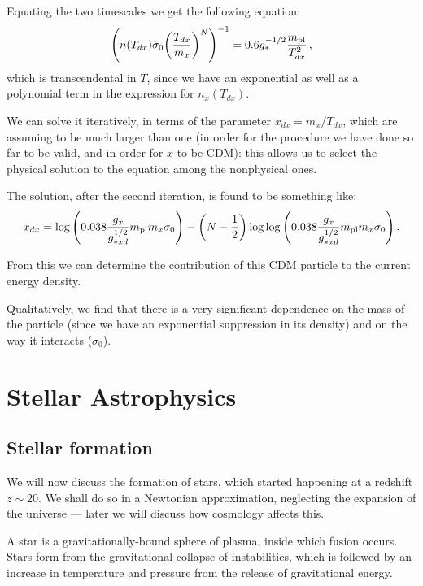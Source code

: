 \documentclass[main.tex]{subfiles}
\begin{document}
Equating the two timescales we get the following equation:
%
\begin{align}
\qty(n(T_{dx}) \sigma _0 \qty(\frac{T_{dx}}{m_x})^{N})^{-1} = \num{.6} g_{*}^{-1/2} \frac{m _{\text{pl}}}{T_{dx}^2}
\,,
\end{align}
%
which is transcendental in \(T\), since we have an exponential as well as a polynomial term in the expression for \(n_x(T_{dx})\).

We can solve it iteratively, in terms of the parameter \(x_{dx} = m_x / T_{dx}\), which are assuming to be much larger than one (in order for the procedure we have done so far to be valid, and in order for \(x\) to be CDM): this allows us to select the physical solution to the equation among the nonphysical ones. 

The solution, after the second iteration, is found to be something like: 
%
\begin{align}
  x_{dx} = \log \qty(\num{.038} \frac{g_{x}}{g_{*xd}^{1/2}} m _{\text{pl}}  m_x \sigma_0 ) - \qty(N - \frac{1}{2}) \log \log \qty(\num{.038} \frac{g_{x}}{g_{*xd}^{1/2}} m _{\text{pl}}  m_x \sigma_0 )
\,. 
\end{align}

From this we can determine the contribution of this CDM particle to the current energy density.

Qualitatively, we find that there is a very significant dependence on the mass of the particle (since we have an exponential suppression in its density) and on the way it interacts (\(\sigma_0 \)).

\chapter{Stellar Astrophysics}

\section{Stellar formation}

We will now discuss the formation of stars, which started happening at a redshift \(z \sim 20\).
We shall do so in a Newtonian approximation, neglecting the expansion of the universe --- later we will discuss how cosmology affects this.

A star is a gravitationally-bound sphere of plasma, inside which fusion occurs. Stars form from the gravitational collapse of instabilities, which is followed by an increase in temperature and pressure from the release of gravitational energy. 
\end{document}

